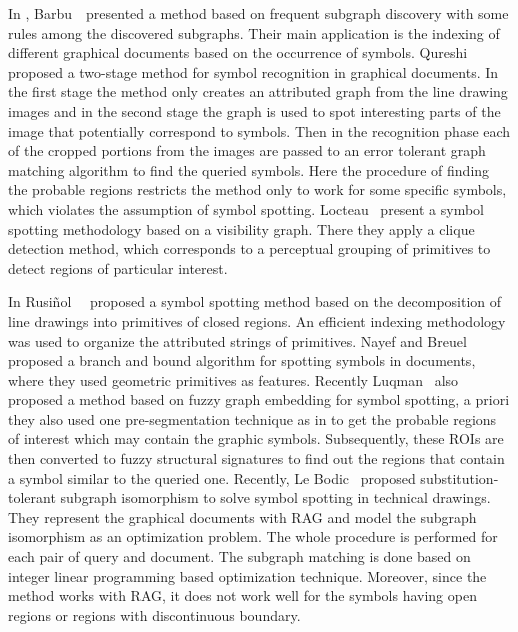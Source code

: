In \cite{Barbu2005a}, Barbu~\etal~presented a method based on frequent subgraph discovery with some rules among the discovered subgraphs. Their main application is the indexing of different graphical documents based on the occurrence of symbols. Qureshi~\etal \cite{Qureshi2007} proposed a two-stage method for symbol recognition in graphical documents. In the first stage the method only creates an attributed graph from the line drawing images and in the second stage the graph is used to spot interesting parts of the image that potentially correspond to symbols. Then in the recognition phase each of the cropped portions from the images are passed to an error tolerant graph matching algorithm to find the queried symbols. Here the procedure of finding the probable regions restricts the method only to work for some specific symbols, which violates the assumption of symbol spotting. Locteau~\etal \cite{Locteau2007} present a symbol spotting methodology based on a visibility graph. There they apply a clique detection method, which corresponds to a perceptual grouping of primitives to detect regions of particular interest.

In \cite{Rusinol2009a} Rusi{\~n}ol~\etal~ proposed a symbol spotting method based on the decomposition of line drawings into primitives of closed regions. An efficient indexing methodology was used to organize the attributed strings of primitives. Nayef and Breuel \cite{Nayef2010} proposed a branch and bound algorithm for spotting symbols in documents, where they used geometric primitives as features. Recently Luqman~\etal \cite{Luqman2010} also proposed a method based on fuzzy graph embedding for symbol spotting, a priori they also used one pre-segmentation technique as in \cite{Qureshi2007} to get the probable regions of interest which may contain the graphic symbols. Subsequently, these ROIs are then converted to fuzzy structural signatures to find out the regions that contain a symbol similar to the queried one. Recently, Le Bodic~\etal \cite{LeBodic2012} proposed substitution-tolerant subgraph isomorphism to solve symbol spotting in technical drawings. They represent the graphical documents with RAG and model the subgraph isomorphism as an optimization problem. The whole procedure is performed for each pair of query and document. The subgraph matching is done based on integer linear programming based optimization technique. Moreover, since the method works with RAG, it does not work well for the symbols having open regions or regions with discontinuous boundary.


